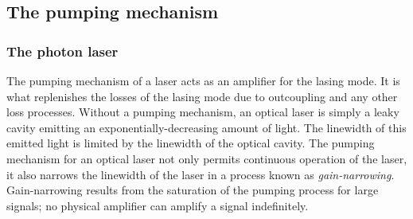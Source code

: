 % 
% 

\subsection{The pumping mechanism}
\label{Introduction:ThePumpingMechanism}

\subsubsection{The photon laser}

The pumping mechanism of a laser acts as an amplifier for the lasing mode.  It is what replenishes the losses of the lasing mode due to outcoupling and any other loss processes.  Without a pumping mechanism, an optical laser is simply a leaky cavity emitting an exponentially-decreasing amount of light.  The linewidth of this emitted light is limited by the linewidth of the optical cavity.  The pumping mechanism for an optical laser not only permits continuous operation of the laser, it also narrows the linewidth of the laser in a process known as \emph{gain-narrowing}.  Gain-narrowing results from the saturation of the pumping process for large signals; no physical amplifier can amplify a signal indefinitely.  


